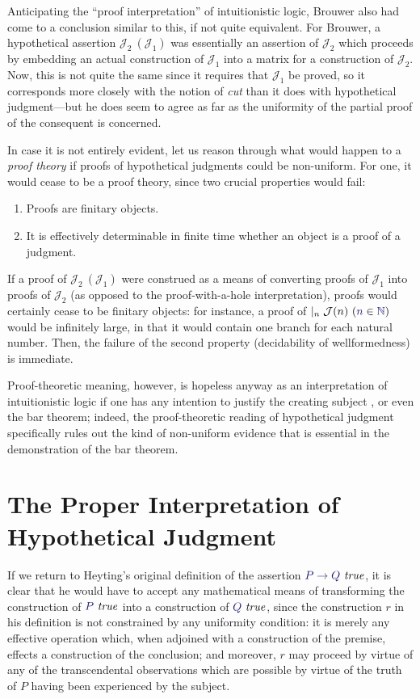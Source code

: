 \documentclass[11pt]{amsart}
\theoremstyle{definition}
\theoremstyle{remark}
\numberwithin{equation}{section}
\def\InputModeColorName{MidnightBlue}
\newcommand\InputMode[1]{{\color{\InputModeColorName}{#1}}}
\newcommand\HypJ[2]{#1\ (#2)}
\newcommand\GenJ[2]{\vert_{#1}\; #2}
\newcommand\JJ{\mathcal{J}}
\newcommand\IsTrue[1]{\InputMode{#1}\ \mathit{true}}
\newcommand\Member[2]{\InputMode{#1}\in \InputMode{#2}}
\newcommand\Nat{\mathbb{N}}
\begin{document}
Anticipating the ``proof interpretation'' of intuitionistic logic, Brouwer also
had come to a conclusion similar to this, if not quite equivalent. For Brouwer,
a hypothetical assertion $\HypJ{\JJ_2}{\JJ_1}$ was essentially an assertion of
$\JJ_2$ which proceeds by embedding an actual construction of $\JJ_1$ into a
matrix for a construction of $\JJ_2$. Now, this is not quite the same since it
requires that $\JJ_1$ be proved, so it corresponds more closely with the notion
of \emph{cut} than it does with hypothetical judgment---but he does seem to
agree as far as the uniformity of the partial proof of the consequent is
concerned.

In case it is not entirely evident, let us reason through what would happen to a
\emph{proof theory} if proofs of hypothetical judgments could be non-uniform.
For one, it would cease to be a proof theory, since two crucial properties would
fail:

\begin{enumerate}
  \item Proofs are finitary objects.
  \item It is effectively determinable in finite time whether an object is
    a proof of a judgment.
\end{enumerate}

If a proof of $\HypJ{\JJ_2}{\JJ_1}$ were construed as a means of converting
proofs of $\JJ_1$ into proofs of $\JJ_2$ (as opposed to the proof-with-a-hole
interpretation), proofs would certainly cease to be finitary objects: for
instance, a proof of $\GenJ{n}{\HypJ{\JJ(n)}{\Member{n}{\Nat}}}$ would be
infinitely large, in that it would contain one branch for each natural number.
Then, the failure of the second property (decidability of wellformedness) is
immediate.

Proof-theoretic meaning, however, is hopeless anyway as an interpretation of
intuitionistic logic if one has any intention to justify the creating subject
\cite{mva:personal}, or even the bar theorem; indeed, the proof-theoretic
reading of hypothetical judgment specifically rules out the kind of non-uniform
evidence that is essential in the demonstration of the bar theorem.

\section{The Proper Interpretation of Hypothetical Judgment}

If we return to Heyting's original definition of the assertion $\IsTrue{P\to
Q}$, it is clear that he would have to accept any mathematical means of
transforming the construction of $\IsTrue{P}$ into a construction of
$\IsTrue{Q}$, since the construction $r$ in his definition is not constrained by
any uniformity condition: it is merely any effective operation which, when
adjoined with a construction of the premise, effects a construction of the
conclusion; and moreover, $r$ may proceed by virtue of any of the transcendental
observations which are possible by virtue of the truth of $P$ having been
experienced by the subject.
\end{document}
